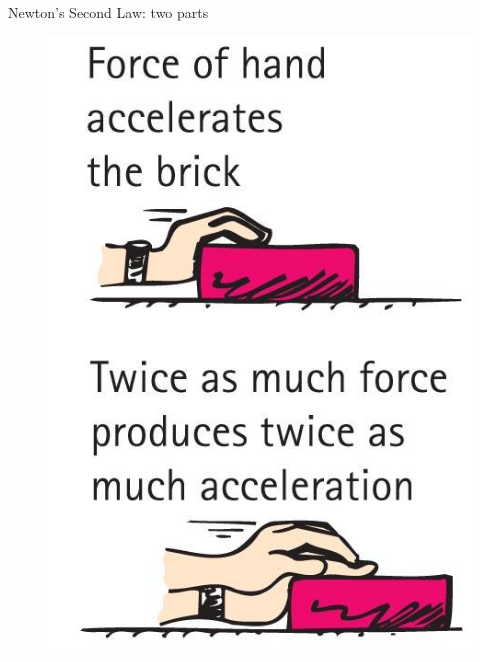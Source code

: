 \documentclass[english]{beamer}
\begin{document}
\begin{frame}{Newton's Second Law: two parts}
  \begin{figure}[!tbp]
    \begin{minipage}[b]{0.4\textwidth}
      \includegraphics[height=0.6\textheight]{./04_02_Figure_cropped.jpg}
    \end{minipage}
    \begin{minipage}[b]{0.4\textwidth}

\end{minipage}
\end{figure}
\end{frame}
\end{document}
